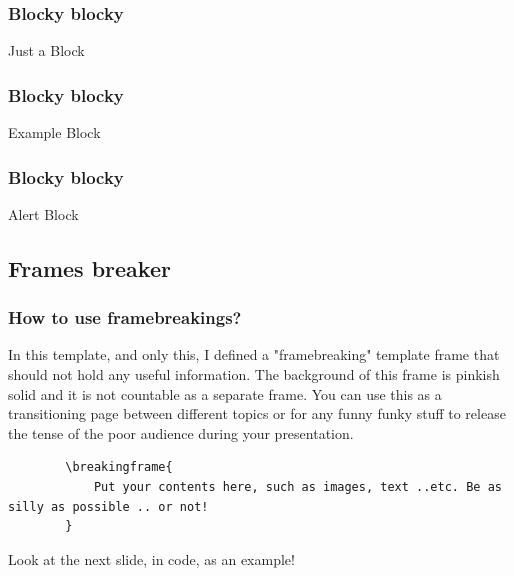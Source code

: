 \documentclass{EESD}
\begin{document}
\begin{frame}
\frametitle{Blocky blocky}
\begin{block}{Just a Block}
\lipsum[1]
\end{block}
\end{frame}

\begin{frame}
\frametitle{Blocky blocky}
\begin{exampleblock}{Example Block}
\lipsum[1]
\end{exampleblock}
\end{frame}

\begin{frame}
\frametitle{Blocky blocky}
\begin{alertblock}{Alert Block}
\lipsum[1]
\end{alertblock}
\end{frame}

\subsection{Frames breaker}
\begin{frame}[fragile]
\frametitle{How to use framebreakings?}
    In this template, and only this, I defined a "framebreaking" template frame that should not hold any useful information. The background of this frame is pinkish solid and it is not countable as a separate frame. You can use this as a transitioning page between different topics or for any funny funky stuff to release the tense of the poor audience during your presentation.
    \vspace{10pt}
    \begin{lstlisting}
        \breakingframe{
            Put your contents here, such as images, text ..etc. Be as silly as possible .. or not!
        }
    \end{lstlisting}
    \vspace{10pt}
    Look at the next slide, in code, as an example!
\end{frame}
\end{document}
